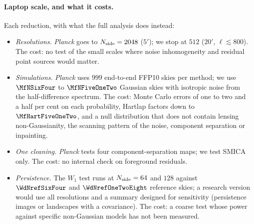 \paragraph{Laptop scale, and what it costs.} Each reduction, with what the full analysis does instead:
\begin{itemize}[itemsep=1pt,leftmargin=1.2em]
  \item \emph{Resolutions.} \textit{Planck} goes to $N_{\rm side}=2048$ ($5'$); we stop at $512$ ($20'$, $\ell\lesssim800$). The cost:
        no test of the small scales where noise inhomogeneity and residual point sources would matter.
  \item \emph{Simulations.} \textit{Planck} uses $999$ end-to-end FFP10 skies per method; we use $\MfNSixFour$ to $\MfNFiveOneTwo$
        Gaussian skies with isotropic noise from the half-difference spectrum. The cost: Monte Carlo errors of one to two and a
        half per cent on each probability, Hartlap factors down to $\MfHartFiveOneTwo$, and a null distribution that does not
        contain lensing non-Gaussianity, the scanning pattern of the noise, component separation or inpainting.
  \item \emph{One cleaning.} \textit{Planck} tests four component-separation maps; we test SMICA only. The cost: no internal check
        on foreground residuals.
  \item \emph{Persistence.} The $W_1$ test runs at $N_{\rm side}=64$ and $128$ against $\WdNrefSixFour$ and $\WdNrefOneTwoEight$
        reference skies; a research version would use all resolutions and a summary designed for sensitivity (persistence
        images or landscapes with a covariance). The cost: a coarse test whose power against specific non-Gaussian
        models has not been measured.
\end{itemize}

